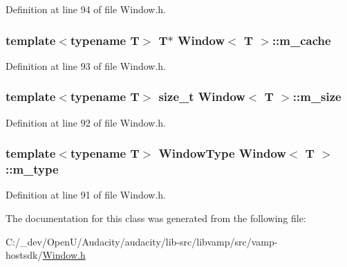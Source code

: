 Definition at line 94 of file Window.\+h.

\subsubsection[{\texorpdfstring{m\+\_\+cache}{m_cache}}]{\setlength{\rightskip}{0pt plus 5cm}template$<$typename T$>$ {\bf T}$\ast$ {\bf Window}$<$ {\bf T} $>$\+::m\+\_\+cache\hspace{0.3cm}{\ttfamily [protected]}}\hypertarget{class_window_a5ea309e48b295ae7fb3e2b9173949842}{}\label{class_window_a5ea309e48b295ae7fb3e2b9173949842}


Definition at line 93 of file Window.\+h.

\subsubsection[{\texorpdfstring{m\+\_\+size}{m_size}}]{\setlength{\rightskip}{0pt plus 5cm}template$<$typename T$>$ size\+\_\+t {\bf Window}$<$ {\bf T} $>$\+::m\+\_\+size\hspace{0.3cm}{\ttfamily [protected]}}\hypertarget{class_window_ab6fe9d589ec181b7d0c10b673145e7e7}{}\label{class_window_ab6fe9d589ec181b7d0c10b673145e7e7}


Definition at line 92 of file Window.\+h.

\subsubsection[{\texorpdfstring{m\+\_\+type}{m_type}}]{\setlength{\rightskip}{0pt plus 5cm}template$<$typename T$>$ {\bf Window\+Type} {\bf Window}$<$ {\bf T} $>$\+::m\+\_\+type\hspace{0.3cm}{\ttfamily [protected]}}\hypertarget{class_window_a5bf6917099e3255f6c8d16207ad20270}{}\label{class_window_a5bf6917099e3255f6c8d16207ad20270}


Definition at line 91 of file Window.\+h.



The documentation for this class was generated from the following file\+:\begin{DoxyCompactItemize}
\item 
C\+:/\+\_\+dev/\+Open\+U/\+Audacity/audacity/lib-\/src/libvamp/src/vamp-\/hostsdk/\hyperlink{libvamp_2src_2vamp-hostsdk_2window_8h}{Window.\+h}\end{DoxyCompactItemize}
